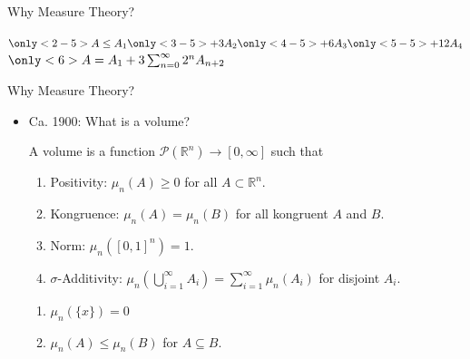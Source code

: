 \documentclass{beamer}
\newcommand{\RR}{\mathbb{R}}
\begin{document}
\begin{frame}{Why Measure Theory?}
  \begin{minipage}{0.45\linewidth}
  \begin{center}
  \end{center}
  \end{minipage}%
  \begin{minipage}{0.45\linewidth}
    $\only<2-5>{A \leq A_1}
       \only<3-5>{+ 3A_2}
       \only<4-5>{+ 6 A_3}
       \only<5-5>{+ 12 A_4}$
    $\only<6>{A = A_1 + 3\sum_{n=0}^\infty 2^n A_{n+2}}$
  \end{minipage}
\end{frame}


\begin{frame}{Why Measure Theory?}

  \begin{itemize}
  \item Ca. 1900: What is a volume?
    \begin{definition}
      A volume is a function $\mathcal{P}(\RR^n) \to [0, \infty]$ such that
      \begin{enumerate}
      \item Positivity: $\mu_n(A) \geq 0$ for all $A \subset \RR^n$.
      \item Kongruence: $\mu_n(A) = \mu_n(B)$ for all kongruent $A$ and $B$.
      \item Norm: $\mu_n([0,1]^n) = 1$.
      \item $\sigma$-Additivity: $\mu_n(\bigcup_{i=1}^{\infty} A_i) =
        \sum_{i=1}^\infty \mu_n(A_i)$ for disjoint $A_i$.
      \end{enumerate}
    \end{definition}
    \begin{lemma}
      \begin{enumerate}
      \item $\mu_n(\{x\}) = 0$
      \item $\mu_n(A) \leq \mu_n(B)$ for $A \subseteq B$.
      \end{enumerate}
    \end{lemma}

  \end{itemize}



\end{frame}
\end{document}
